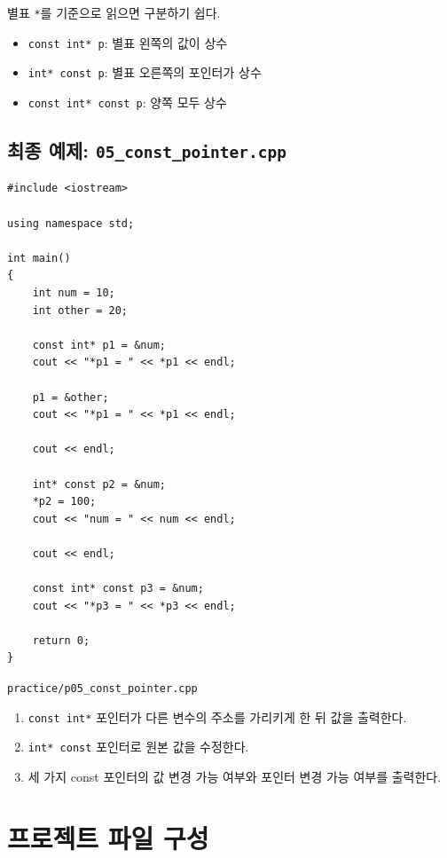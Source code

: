 \documentclass[11pt,a4paper]{article}
\begin{document}
\begin{importantbox}
별표 \texttt{*}를 기준으로 읽으면 구분하기 쉽다.
\begin{itemize}[leftmargin=1.5em]
    \item \texttt{const int* p}: 별표 왼쪽의 값이 상수
    \item \texttt{int* const p}: 별표 오른쪽의 포인터가 상수
    \item \texttt{const int* const p}: 양쪽 모두 상수
\end{itemize}
\end{importantbox}

\subsection{최종 예제: \texttt{05\_const\_pointer.cpp}}

\begin{lstlisting}
#include <iostream>

using namespace std;

int main()
{
    int num = 10;
    int other = 20;

    const int* p1 = &num;
    cout << "*p1 = " << *p1 << endl;

    p1 = &other;
    cout << "*p1 = " << *p1 << endl;

    cout << endl;

    int* const p2 = &num;
    *p2 = 100;
    cout << "num = " << num << endl;

    cout << endl;

    const int* const p3 = &num;
    cout << "*p3 = " << *p3 << endl;

    return 0;
}
\end{lstlisting}

\begin{practicebox}
\texttt{practice/p05\_const\_pointer.cpp}
\begin{enumerate}[leftmargin=1.5em]
    \item \texttt{const int*} 포인터가 다른 변수의 주소를 가리키게 한 뒤 값을 출력한다.
    \item \texttt{int* const} 포인터로 원본 값을 수정한다.
    \item 세 가지 const 포인터의 값 변경 가능 여부와 포인터 변경 가능 여부를 출력한다.
\end{enumerate}
\end{practicebox}

\section{프로젝트 파일 구성}
\end{document}
